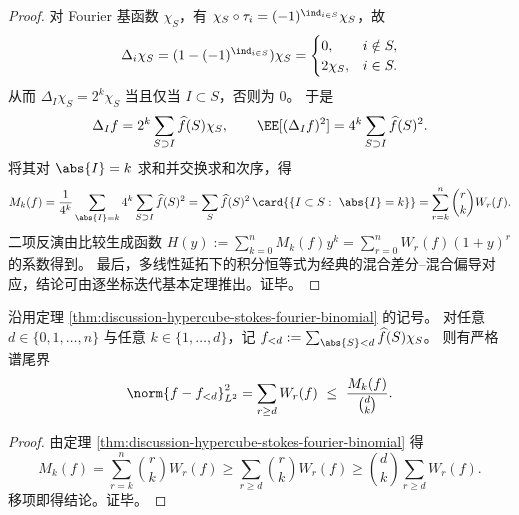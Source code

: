 \begin{proof}
对 Fourier 基函数 \(\chi_S\)，有 \(\chi_S\circ\tau_i=(-1)^{\ind_{i\in S}}\chi_S\)，故
\[
  \Delta_i\chi_S=(1-(-1)^{\ind_{i\in S}})\chi_S=
  \begin{cases}
    0,&i\notin S,\\
    2\chi_S,&i\in S.
  \end{cases}
\]
从而 \(\Delta_I\chi_S=2^k\chi_S\) 当且仅当 \(I\subset S\)，否则为 \(0\)。
于是
\[
  \Delta_I f=2^k\sum_{S\supset I}\widehat f(S)\chi_S,
  \qquad
  \EE[(\Delta_I f)^2]=4^k\sum_{S\supset I}\widehat f(S)^2.
\]
将其对 \(\abs{I}=k\) 求和并交换求和次序，得
\[
  M_k(f)
  =\frac1{4^k}\sum_{\abs{I}=k}4^k\sum_{S\supset I}\widehat f(S)^2
  =\sum_S\widehat f(S)^2\,\card{\{I\subset S:\ \abs{I}=k\}}
  =\sum_{r=k}^n\binom{r}{k}W_r(f).
\]
二项反演由比较生成函数
\(
H(y):=\sum_{k=0}^nM_k(f)y^k=\sum_{r=0}^nW_r(f)(1+y)^r
\)
的系数得到。
最后，多线性延拓下的积分恒等式为经典的混合差分--混合偏导对应，结论可由逐坐标迭代基本定理推出。证毕。
\end{proof}

\begin{theorem}[由差分通量矩给出的谱尾界与证书化误差控制]\label{thm:discussion-spectral-tail-bound-from-flux}
沿用定理 \ref{thm:discussion-hypercube-stokes-fourier-binomial} 的记号。
对任意 \(d\in\{0,1,\dots,n\}\) 与任意 \(k\in\{1,\dots,d\}\)，记 \(f_{<d}:=\sum_{\abs{S}<d}\widehat f(S)\chi_S\)。
则有严格谱尾界
\[
  \norm{f-f_{<d}}_{L^2}^2=\sum_{r\ge d}W_r(f)\ \le\ \frac{M_k(f)}{\binom{d}{k}}.
\]
\end{theorem}

\begin{proof}
由定理 \ref{thm:discussion-hypercube-stokes-fourier-binomial} 得
\[
  M_k(f)=\sum_{r=k}^n\binom{r}{k}W_r(f)
  \ge \sum_{r\ge d}\binom{r}{k}W_r(f)
  \ge \binom{d}{k}\sum_{r\ge d}W_r(f).
\]
移项即得结论。证毕。
\end{proof}

